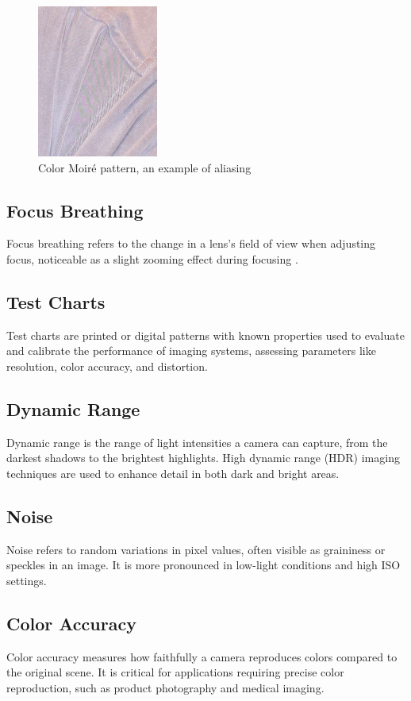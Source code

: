 \begin{figure}[htbp]
\centering
\includegraphics[height=5cm]{Images/color_moire.jpg}
\caption{Color Moiré pattern, an example of aliasing \cite{Aliasing}}
\label{fig:moire}
\end{figure}

\subsection{Focus Breathing}
Focus breathing refers to the change in a lens's field of view when adjusting focus, noticeable as a slight zooming effect during focusing \cite{FocusBreathing}.

\subsection{Test Charts}
Test charts are printed or digital patterns with known properties used to evaluate and calibrate the performance of imaging systems, assessing parameters like resolution, color accuracy, and distortion.

\subsection{Dynamic Range}
Dynamic range is the range of light intensities a camera can capture, from the darkest shadows to the brightest highlights. High dynamic range (HDR) imaging techniques are used to enhance detail in both dark and bright areas.

\subsection{Noise}
Noise refers to random variations in pixel values, often visible as graininess or speckles in an image. It is more pronounced in low-light conditions and high ISO settings.

\subsection{Color Accuracy}
Color accuracy measures how faithfully a camera reproduces colors compared to the original scene. It is critical for applications requiring precise color reproduction, such as product photography and medical imaging.
